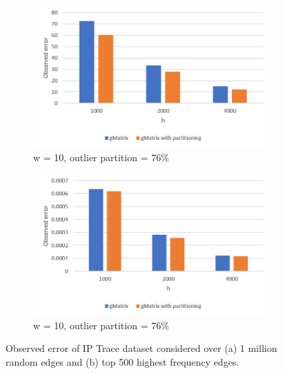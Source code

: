 \begin{figure}[!htbp]
\centering
\begin{subfigure}{.5\textwidth}
  \centering
  \includegraphics[width=1\linewidth]{I1}
  \caption{w = 10, outlier partition = 76\%}
  \label{fig:sub1}
\end{subfigure}%
\begin{subfigure}{.5\textwidth}
  \centering
  \includegraphics[width=1\linewidth]{I1T}
  \caption{w = 10, outlier partition = 76\%}
  \label{fig:sub2}
\end{subfigure}
\caption{Observed error of IP Trace dataset considered over (a) 1 million random edges and (b) top 500 highest frequency edges.}
\label{fig:i1}
\end{figure}

